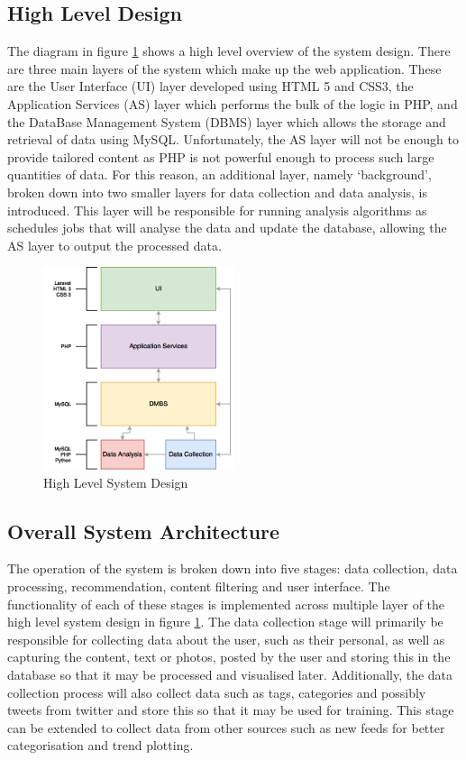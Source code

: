 \subsection{High Level Design}
The diagram in figure \ref{fig:LayerArchitecture} shows a high level overview of the system design. There are three main layers of the system which make up the web application. These are the User Interface (UI) layer developed using HTML 5 and CSS3, the Application Services (AS) layer which performs the bulk of the logic in PHP, and the DataBase Management System (DBMS) layer which allows the storage and retrieval of data using MySQL. Unfortunately, the AS layer will not be enough to provide tailored content as PHP is not powerful enough to process such large quantities of data. For this reason, an additional layer, namely `background', broken down into two smaller layers for data collection and data analysis, is introduced. This layer will be responsible for running analysis algorithms as schedules jobs that will analyse the data and update the database, allowing the AS layer to output the processed data.

\begin{figure}[H]
  \centering
  \includegraphics[width=0.5\textwidth]{Images/Design/LayerArchitecture}
  \caption{High Level System Design} \label{fig:LayerArchitecture} 
\end{figure}

\subsection{Overall System Architecture}
The operation of the system is broken down into five stages: data collection, data processing, recommendation, content filtering and user interface. The functionality of each of these stages is implemented across multiple layer of the high level system design in figure \ref{fig:LayerArchitecture}. The data collection stage will primarily be responsible for collecting data about the user, such as their personal, as well as capturing the content, text or photos, posted by the user and storing this in the database so that it may be processed and visualised later. Additionally, the data collection process will also collect data such as tags, categories and possibly tweets from twitter and store this so that it may be used for training. This stage can be extended to collect data from other sources such as new feeds for better categorisation and trend plotting. 


